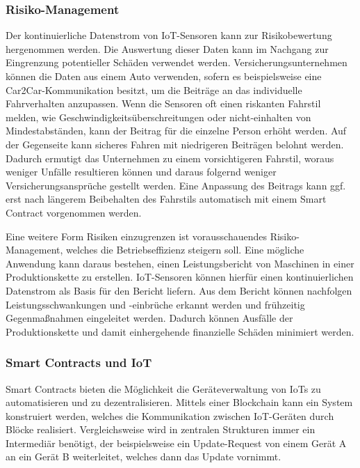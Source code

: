 \subsubsection{Risiko-Management}
\label{sec:Risk_Management}
Der kontinuierliche Datenstrom von IoT-Sensoren kann zur Risikobewertung hergenommen werden.
Die Auswertung dieser Daten kann im Nachgang zur Eingrenzung potentieller Schäden 
verwendet werden.
Versicherungsunternehmen können die Daten aus einem Auto verwenden, sofern es beispielsweise
eine Car2Car-Kommunikation besitzt, um die Beiträge an das individuelle Fahrverhalten
anzupassen. 
Wenn die Sensoren oft einen riskanten Fahrstil melden, wie Geschwindigkeitsüberschreitungen oder 
nicht-einhalten von Mindestabständen, kann der Beitrag für die einzelne Person erhöht werden. Auf der 
Gegenseite kann sicheres Fahren mit niedrigeren Beiträgen belohnt werden. 
Dadurch ermutigt das Unternehmen zu einem vorsichtigeren Fahrstil, woraus weniger Unfälle resultieren 
können und daraus folgernd weniger Versicherungsansprüche gestellt werden.
\cite[p.~169f]{chowdhary2025smart}
Eine Anpassung des Beitrags kann ggf. erst nach längerem Beibehalten des Fahrstils automatisch mit einem 
Smart Contract vorgenommen werden.

Eine weitere Form Risiken einzugrenzen ist vorausschauendes Risiko-Management, welches die 
Betriebseffizienz steigern soll.
Eine mögliche Anwendung kann daraus bestehen, einen Leistungsbericht von Maschinen in einer Produktionskette
zu erstellen. IoT-Sensoren können hierfür einen kontinuierlichen Datenstrom als Basis für den Bericht liefern.
Aus dem Bericht können nachfolgen Leistungsschwankungen und -einbrüche erkannt werden und frühzeitig 
Gegenmaßnahmen eingeleitet werden. Dadurch können Ausfälle der Produktionskette und damit einhergehende 
finanzielle Schäden minimiert werden.
\cite[p.~169]{chowdhary2025smart}





\subsubsection{Smart Contracts und IoT}
Smart Contracts bieten die Möglichkeit die Geräteverwaltung von IoTs zu automatisieren und zu dezentralisieren.
Mittels einer Blockchain kann ein System konstruiert werden, welches die Kommunikation zwischen IoT-Geräten
durch Blöcke realisiert. 
Vergleichsweise wird in zentralen Strukturen immer ein Intermediär benötigt, der beispielsweise ein 
Update-Request von einem Gerät A an ein Gerät B weiterleitet, welches dann das Update vornimmt.

